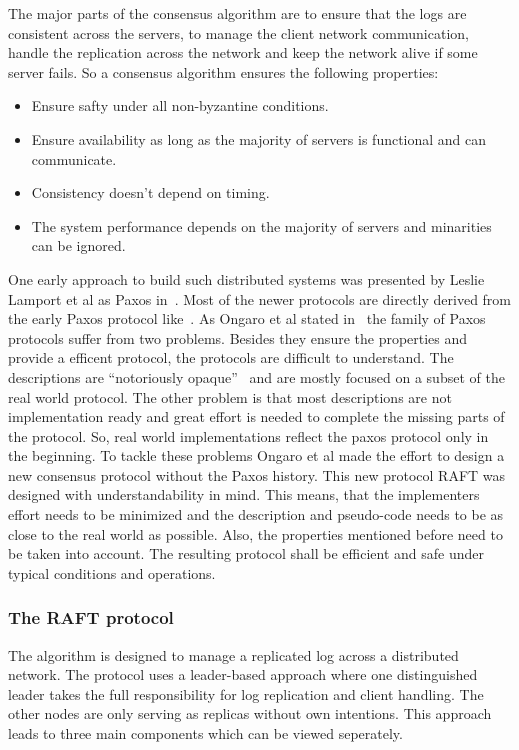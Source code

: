 The major parts of the consensus algorithm are to ensure that the logs are
consistent across the servers, to manage the client network communication,
handle the replication across the network and keep the network alive if
some server fails. So a consensus algorithm ensures the following properties:~\cite{ongaro2014search}

\begin{itemize}
\item Ensure safty under all non-byzantine conditions.
\item Ensure availability as long as the majority of servers is
  functional and can communicate.
\item Consistency doesn't depend on timing.
\item The system performance depends on the majority of servers
  and minarities can be ignored.
\end{itemize}

One early approach to build such distributed systems was presented by
Leslie Lamport et al as Paxos in~\cite{lamport1978time}.
Most of the newer protocols are directly derived from the early Paxos
protocol like~\cite{lamport2001paxos, van2015paxos}.
As Ongaro et al stated in~\cite{ongaro2014search} the family of
Paxos protocols suffer from two problems. Besides they ensure the
properties and provide a efficent protocol, the protocols are
difficult to understand. The descriptions are ``notoriously
opaque''~\cite{ongaro2014search} and are mostly focused on a
subset of the real world protocol. The other problem is that
most descriptions are not implementation ready and great effort
is needed to complete the missing parts of the protocol.
So, real world implementations reflect the paxos protocol only in
the beginning. To tackle these problems Ongaro et al made
the effort to design a new consensus protocol without the
Paxos history. This new protocol RAFT was designed with
understandability in mind. This means, that the implementers
effort needs to be minimized and the description and pseudo-code
needs to be as close to the real world as possible. Also,
the properties mentioned before need to be taken into account.
The resulting protocol shall be efficient and safe under
typical conditions and operations.~\cite{ongaro2014search}

\subsubsection*{The RAFT protocol}
The algorithm is designed to manage a replicated log
across a distributed network. The protocol uses a leader-based
approach where one distinguished leader takes the full responsibility
for log replication and client handling. The other nodes are
only serving as replicas without own intentions. This approach
leads to three main components which can be viewed seperately.~\cite{ongaro2014search}

